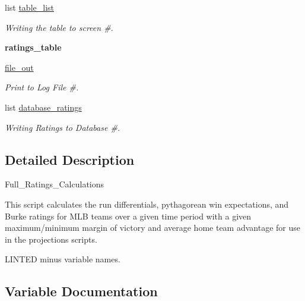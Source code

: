 \begin{DoxyCompactItemize}
\item 
list \hyperlink{namespacefull__ratings__calculations_aea6fcad67a2966594f87438dc1f03bf7}{table\+\_\+list}
\begin{DoxyCompactList}\small\item\em Writing the table to screen \#. \end{DoxyCompactList}\item 
{\bfseries ratings\+\_\+table}
\item 
\hyperlink{namespacefull__ratings__calculations_ad222c702d72dea5e00727f1bcab409e5}{file\+\_\+out}
\begin{DoxyCompactList}\small\item\em Print to Log File \#. \end{DoxyCompactList}\item 
list \hyperlink{namespacefull__ratings__calculations_a3a94f1d9d2af1e1c5501e0179768384d}{database\+\_\+ratings}
\begin{DoxyCompactList}\small\item\em Writing Ratings to Database \#. \end{DoxyCompactList}\end{DoxyCompactItemize}


\subsection{Detailed Description}
\begin{DoxyVerb}Full_Ratings_Calculations

This script calculates the run differentials, pythagorean win expectations,
and Burke ratings for MLB teams over a given time period with a given
maximum/minimum margin of victory and average home team advantage for use in the projections
scripts.

LINTED minus variable names.\end{DoxyVerb}
 

\subsection{Variable Documentation}
